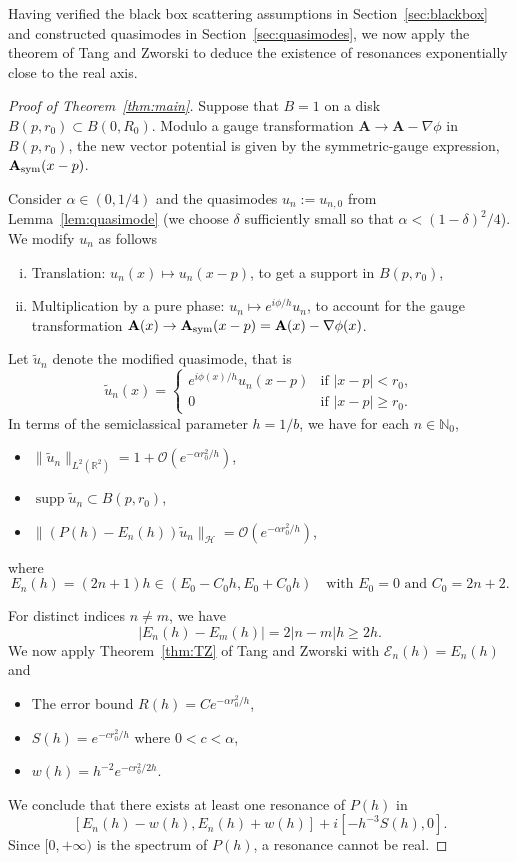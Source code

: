 \documentclass[11pt]{amsart}
\theoremstyle{remark}
\newcommand{\bA}{\mathbf{A}}
\newcommand{\R}{\mathbb{R}}
\numberwithin{equation}{section}
\begin{document}
Having verified the black box scattering assumptions in Section~\ref{sec:blackbox} and constructed quasimodes in Section~\ref{sec:quasimodes}, we now apply the theorem of Tang and Zworski \cite{TZ} to deduce the existence of resonances exponentially close to the real axis.

\begin{proof}[Proof of Theorem~\ref{thm:main}]
Suppose that $B=1$ on a disk $B(p,r_0)\subset B(0,R_0)$. Modulo a gauge transformation $\bA\to\bA-\nabla\phi$ in $B(p,r_0)$, the new vector potential  is given by the symmetric-gauge expression, $\bA_{\rm sym}(x-p)$. 

Consider $\alpha\in(0,1/4)$ and the quasimodes $u_n:=u_{n,0}$ from Lemma~\ref{lem:quasimode} (we choose $\delta$ sufficiently small so that $\alpha<(1-\delta)^2/4$). We modify $u_n$ as follows
\begin{enumerate}[i)]
\item Translation: $u_n(x)\mapsto u_n(x-p)$, to get a support in $B(p,r_0)$,
\item  Multiplication by a pure phase: $u_n \mapsto e^{i\phi/h}u_n$, to account for the gauge transformation $\bA(x)\to \bA_{\rm sym}(x-p)=\bA(x)-\nabla \phi(x)$.
\end{enumerate}
Let $\tilde u_n$ denote the modified quasimode, that is
\[\tilde u_n(x)=\begin{cases}
    e^{i\phi(x)/h}u_n(x-p)&\mbox{if }|x-p|<r_0,\\
    0&\mbox{if }|x-p|\geq r_0.
\end{cases}\]
In terms of the semiclassical parameter
$h = 1/b$, we have  for each $n \in \mathbb{N}_0$, 
\begin{itemize}
    \item $\|\tilde u_n\|_{L^2(\R^2)} = 1 + \mathcal{O}(e^{-\alpha r_0^2/h})$,
    \item $\operatorname{supp} \tilde u_n \subset B(p,r_0)$,
    \item $\|(P(h) - E_n(h))\tilde u_n\|_{\mathcal{H}} = \mathcal{O}(e^{-\alpha r_0^2/h})$,
\end{itemize}
where 
\[
E_n(h) = (2n+1)h\in (E_0-C_0h,E_0+C_0h)\quad\mbox{with }E_0=0\mbox{ and }C_0=2n+2.
\]

For distinct indices $n \neq m$, we have
\[
|E_n(h) - E_m(h)| = 2|n-m|h \geq 2h.
\]
We now apply Theorem~\ref{thm:TZ} of Tang and Zworski with $\mathcal E_n(h)=E_n(h)$ and
\begin{itemize}
    \item The error bound $R(h) = C e^{-\alpha r_0^2/h}$,
    \item $S(h) = e^{-c r_0^2/h}$ where $0<c<\alpha$,
    \item $w(h)=h^{-2}e^{-cr_0^2/2h}$.
\end{itemize}
We conclude that there exists at least one resonance of $P(h)$ in
\[
 [E_n(h) - w(h), E_n(h) + w(h)] + i[-h^{-3}S(h), 0].
\]
Since $[0,+\infty)$ is the spectrum of $P(h)$, a resonance cannot be real. 
\end{proof}
\end{document}
